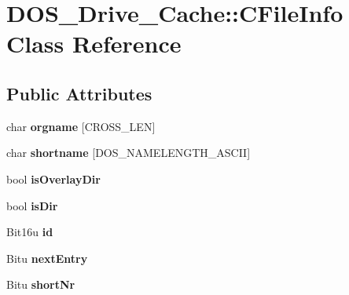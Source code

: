 \hypertarget{classDOS__Drive__Cache_1_1CFileInfo}{\section{D\-O\-S\-\_\-\-Drive\-\_\-\-Cache\-:\-:C\-File\-Info Class Reference}
\label{classDOS__Drive__Cache_1_1CFileInfo}
}
\subsection*{Public Attributes}
\begin{DoxyCompactItemize}
\item 
\hypertarget{classDOS__Drive__Cache_1_1CFileInfo_a54e3d2f75fcbb74f75db034953e229a3}{char {\bfseries orgname} \mbox{[}C\-R\-O\-S\-S\-\_\-\-L\-E\-N\mbox{]}}\label{classDOS__Drive__Cache_1_1CFileInfo_a54e3d2f75fcbb74f75db034953e229a3}

\item 
\hypertarget{classDOS__Drive__Cache_1_1CFileInfo_a4bc96390314c8e5458bdb6fca24526e5}{char {\bfseries shortname} \mbox{[}D\-O\-S\-\_\-\-N\-A\-M\-E\-L\-E\-N\-G\-T\-H\-\_\-\-A\-S\-C\-I\-I\mbox{]}}\label{classDOS__Drive__Cache_1_1CFileInfo_a4bc96390314c8e5458bdb6fca24526e5}

\item 
\hypertarget{classDOS__Drive__Cache_1_1CFileInfo_a36a3b8a7c17f16893a6e38db7ab871e0}{bool {\bfseries is\-Overlay\-Dir}}\label{classDOS__Drive__Cache_1_1CFileInfo_a36a3b8a7c17f16893a6e38db7ab871e0}

\item 
\hypertarget{classDOS__Drive__Cache_1_1CFileInfo_a5fd697ccc70ceb461b00ac5e0a3b0a6a}{bool {\bfseries is\-Dir}}\label{classDOS__Drive__Cache_1_1CFileInfo_a5fd697ccc70ceb461b00ac5e0a3b0a6a}

\item 
\hypertarget{classDOS__Drive__Cache_1_1CFileInfo_a7431fc652afc211a9f5688d3dc6dac54}{Bit16u {\bfseries id}}\label{classDOS__Drive__Cache_1_1CFileInfo_a7431fc652afc211a9f5688d3dc6dac54}

\item 
\hypertarget{classDOS__Drive__Cache_1_1CFileInfo_a070341474c5331b61978b1fa4e397fba}{Bitu {\bfseries next\-Entry}}\label{classDOS__Drive__Cache_1_1CFileInfo_a070341474c5331b61978b1fa4e397fba}

\item 
\hypertarget{classDOS__Drive__Cache_1_1CFileInfo_aabcdb2db6a8c70ad16109e5662141f61}{Bitu {\bfseries short\-Nr}}\label{classDOS__Drive__Cache_1_1CFileInfo_aabcdb2db6a8c70ad16109e5662141f61}


\end{DoxyCompactItemize}
